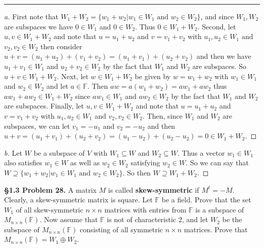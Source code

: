 \documentclass[leqno]{article}
\theoremstyle{nonumberplain}
\newtheorem{proof}{Proof}
\begin{document}
\noindent\rule[0.5ex]{\linewidth}{1pt}

\begin{proof}[a]
First note that $W_1+W_2=\{w_1 + w_2 | w_1\in W_1 \textrm{ and } w_2\in W_2\}$, and since $W_1,W_2$ are subspaces we have $0\in W_1$ and $0\in W_2$. Thus $0\in W_1+W_2$.  Second, let $u,v \in W_1+W_2$ and note that $u=u_1+u_2$ and $v=v_1+v_2$ with $u_1,u_2 \in W_1$ and $v_2,v_2 \in W_2$ then consider $u+v = (u_1 + u_2)+(v_1 + v_2)=(u_1+v_1)+(u_2+v_2)$ and then we have $u_1+v_1 \in W_1$ and $u_2+v_2 \in W_2$ by the fact that $W_1$ and $W_2$ are subspaces. So $u+v\in W_1+W_2$. Next, let $w\in W_1+W_2$ be given by $w=w_1+w_2$ with $w_1\in W_1$ and $w_2 \in W_2$ and let $a\in \mathbb{F}$.  Then $aw=a(w_1+w_2)=aw_1+aw_2$ thus $aw_1+aw_2\in W_1+W_2$ since $aw_1 \in W_1$ and $aw_2 \in W_2$ by the fact that $W_1$ and $W_2$ are subspaces.  Finally, let $u,v \in W_1+W_2$ and note that $u=u_1+u_2$ and $v=v_1+v_2$ with $u_1,u_2 \in W_1$ and $v_2,v_2 \in W_2$.  Then, since $W_1$ and $W_2$ are subspaces, we can let $v_1=-u_1$ and $v_2=-u_2$ and then $u+v=(u_1+v_1)+(u_2+v_2)=(u_1-u_2)+(u_2-u_2)=0\in W_1+W_2$.
\end{proof}

\begin{proof}[b]
Let $W$ be a subspace of $V$ with $W_1\subseteq W$ and $W_2\subseteq W$.  Thus a vector $w_1\in W_1$ also satisfies $w_1\in W$ as well as $w_2 \in W_2$ satisfying $w_2 \in W$.  So we can say that $W\supseteq \{w_1+w_2 | w_1\in W_1 \textrm{ and } w_2 \in W_2\}$. So then $W\supseteq W_1+W_2$.
\end{proof}

\pagebreak




\noindent\textbf{\S 1.3 Problem 28.} A matrix $M$ is called \textbf{skew-symmetric} if $M^t=-M$. Clearly, a skew-symmetric matrix is square. Let $\mathbb{F}$ be a field. Prove that the set $W_1$ of all skew-symmetric $n\times n$ matrices with entries from $\mathbb{F}$ is a subspace of $M_{n\times n}(\mathbb{F})$. Now assume that $\mathbb{F}$ is not of characteristic $2$, and let $W_2$ be the subspace of $M_{n\times n}(\mathbb{F})$ consisting of all symmetric $n \times n$ matrices. Prove that $M_{n\times n}(\mathbb{F})=W_1 \oplus W_2$.
\end{document}
